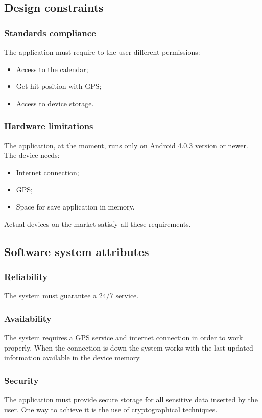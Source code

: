 \subsection{Design constraints}
\subsubsection{Standards compliance}
The application must require to the user different permissions:
\begin{itemize}
	\item Access to the calendar;
	\item Get hit position with GPS;
	\item Access to device storage.
\end{itemize}
\subsubsection{Hardware limitations}
The application, at the moment, runs only on Android 4.0.3 version or newer. \\
The device needs:
\begin{itemize}
	\item Internet connection;
	\item GPS;
	\item Space for save application in memory.
\end{itemize}
Actual devices on the market satisfy all these requirements.
\subsection{Software system attributes}
\subsubsection{Reliability}
The system must guarantee a 24/7 service.
\subsubsection{Availability}
The system requires a GPS service and internet connection in order to work properly. When the connection is down the system works with the last updated information available in the device memory.  
\subsubsection{Security}
The application must provide secure storage for all sensitive data inserted by the user. One way to achieve it is the use of cryptographical techniques.
